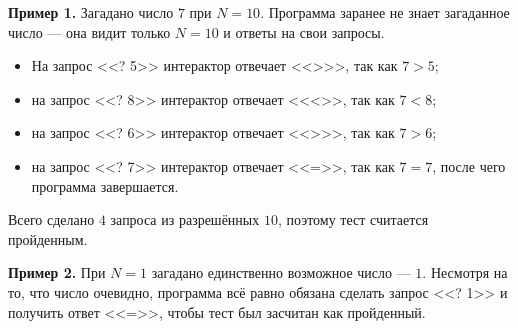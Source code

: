 \textbf{Пример 1.} Загадано число $7$ при $N = 10$. Программа заранее не знает загаданное число --- она видит только $N = 10$ и ответы на свои запросы.

\begin{itemize}
\item На запрос <<? 5>> интерактор отвечает <<>>>, так как $7 > 5$;
\item на запрос <<? 8>> интерактор отвечает <<<>>, так как $7 < 8$;
\item на запрос <<? 6>> интерактор отвечает <<>>>, так как $7 > 6$;
\item на запрос <<? 7>> интерактор отвечает <<=>>, так как $7 = 7$, после чего программа завершается.
\end{itemize}

Всего сделано $4$ запроса из разрешённых $10$, поэтому тест считается пройденным.

\textbf{Пример 2.} При $N = 1$ загадано единственно возможное число --- $1$. Несмотря на то, что число очевидно, программа всё равно обязана сделать запрос <<? 1>> и получить ответ <<=>>, чтобы тест был засчитан как пройденный.
